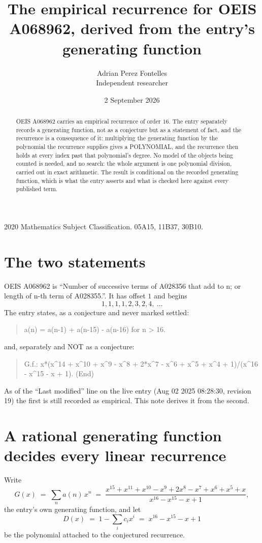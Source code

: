 \documentclass[11pt,a4paper]{article}
\title{The empirical recurrence for OEIS A068962, derived from the entry's generating function}
\author{Adrian Perez Fontelles\\ \small Independent researcher}
\date{2 September 2026}
\theoremstyle{plain}
\theoremstyle{definition}
\begin{document}
\maketitle

\begin{abstract}
OEIS A068962 carries an empirical recurrence of order $16$. The entry separately records a
generating function, not as a conjecture but as a statement of fact, and the recurrence is a
consequence of it: multiplying the generating function by the polynomial the recurrence
supplies gives a POLYNOMIAL, and the recurrence then holds at every index past that
polynomial's degree. No model of the objects being counted is needed, and no search: the
whole argument is one polynomial division, carried out in exact arithmetic. The result is
conditional on the recorded generating function, which is what the entry asserts and what is
checked here against every published term.
\end{abstract}

\noindent\small 2020 Mathematics Subject Classification. 05A15, 11B37, 30B10.\normalsize

\section{The two statements}

OEIS A068962 is ``Number of successive terms of A028356 that add to n; or length of n-th term of A028355.''. It has offset $1$ and begins
\[
1, 1, 1, 1, 2, 3, 2, 4,\ \dots
\]
The entry states, as a conjecture and never marked settled:
\begin{quote}
a(n) = a(n-1) + a(n-15) - a(n-16) for n > 16.
\end{quote}
and, separately and NOT as a conjecture:
\begin{quote}
G.f.: x*(x\^{}14 + x\^{}10 + x\^{}9 - x\^{}8 + 2*x\^{}7 - x\^{}6 + x\^{}5 + x\^{}4 + 1)/(x\^{}16 - x\^{}15 - x + 1). (End)
\end{quote}
As of the ``Last modified'' line on the live entry (Aug 02 2025 08:28:30, revision 19) the first is still
recorded as empirical. This note derives it from the second.

\section{A rational generating function decides every linear recurrence}

Write
\[
G(x)\;=\;\sum_{n}a(n)\,x^{n}\;=\;\frac{x^{15} + x^{11} + x^{10} - x^{9} + 2 x^{8} - x^{7} + x^{6} + x^{5} + x}{x^{16} - x^{15} - x + 1},
\]
the entry's own generating function, and let
\[
D(x)\;=\;1-\sum_i c_i x^{i}\;=\;x^{16} - x^{15} - x + 1
\]
be the polynomial attached to the conjectured recurrence.
\end{document}
